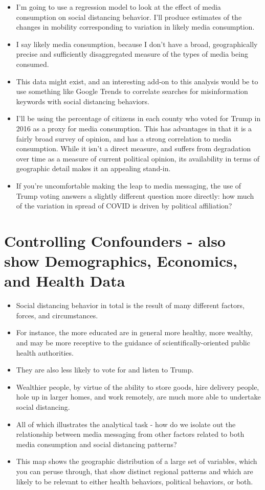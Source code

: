 \documentclass{article}
\begin{document}
\begin{itemize}
	\item I'm going to use a regression model to look at the effect of media consumption on social distancing behavior. I'll produce estimates of the changes in mobility corresponding to variation in likely media consumption. \item I say likely media consumption, because I don't have a broad, geographically precise and sufficiently disaggregated measure of the types of media being consumed.
	\item This data might exist, and an interesting add-on to this analysis would be to use something like Google Trends to correlate searches for misinformation keywords with social distancing behaviors. 
	\item I'll be using the percentage of citizens in each county who voted for Trump in 2016 as a proxy for media consumption. This has advantages in that it is a fairly broad survey of opinion, and has a strong correlation to media consumption. While it isn't a direct measure, and suffers from degradation over time as a measure of current political opinion, its availability in terms of geographic detail makes it an appealing stand-in. 
	\item If you're uncomfortable making the leap to media messaging, the use of Trump voting answers a slightly different question more directly: how much of the variation in spread of COVID is driven by political affiliation?
\end{itemize}

\section{Controlling Confounders - also show Demographics, Economics, and Health Data}

\begin{itemize}
	\item Social distancing behavior in total is the result of many different factors, forces, and circumstances. 
	\item For instance, the more educated are in general more healthy, more wealthy, and may  be more receptive to the guidance of scientifically-oriented public health  authorities. 
	\item They are also less likely to vote for and listen to Trump.
	\item Wealthier people, by virtue of the ability to store goods, hire delivery people, hole up in larger homes, and work remotely, are much more able to undertake social distancing.
	\item All of which illustrates the analytical task - how do we isolate out the relationship between media messaging from other factors related to both media consumption and social distancing patterns?
	\item This map shows the geographic distribution of a large set of variables, which you can peruse through, that show distinct regional patterns and which are likely to be relevant to either health behaviors, political behaviors, or both. 
\end{itemize}
\end{document}
